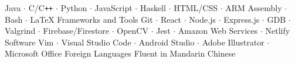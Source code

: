

\begin{cvskills}
	{Java $\cdot$ C/C\texttt{++} $\cdot$ Python $\cdot$ JavaScript $\cdot$ Haskell $\cdot$ HTML/CSS $\cdot$ ARM Assembly $\cdot$ Bash $\cdot$ \LaTeX}
	\cvskill
	{Frameworks and Tools}
	{Git $\cdot$ React $\cdot$ Node.js $\cdot$ Express.js $\cdot$ GDB $\cdot$ Valgrind $\cdot$ Firebase/Firestore $\cdot$ OpenCV $\cdot$ Jest $\cdot$ Amazon Web Services $\cdot$ Netlify}
	\cvskill
	{Software}
	{Vim $\cdot$ Visual Studio Code $\cdot$ Android Studio $\cdot$ Adobe Illustrator $\cdot$ Microsoft Office}
	\cvskill
	{Foreign Languages}
	{Fluent in Mandarin Chinese}
\end{cvskills}